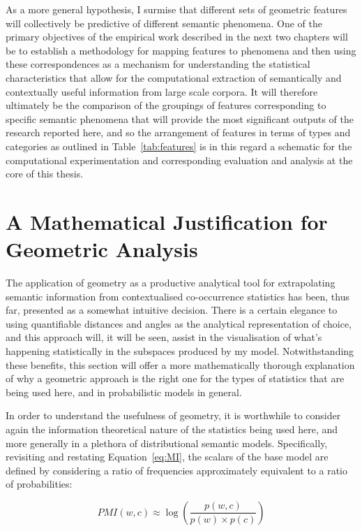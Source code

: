 As a more general hypothesis, I surmise that different sets of geometric features will collectively be predictive of different semantic phenomena.  One of the primary objectives of the empirical work described in the next two chapters will be to establish a methodology for mapping features to phenomena and then using these correspondences as a mechanism for understanding the statistical characteristics that allow for the computational extraction of semantically and contextually useful information from large scale corpora.  It will therefore ultimately be the comparison of the groupings of features corresponding to specific semantic phenomena that will provide the most significant outputs of the research reported here, and so the arrangement of features in terms of types and categories as outlined in Table~\ref{tab:features} is in this regard a schematic for the computational experimentation and corresponding evaluation and analysis at the core of this thesis.

\section{A Mathematical Justification for Geometric Analysis}
The application of geometry as a productive analytical tool for extrapolating semantic information from contextualised co-occurrence statistics has been, thus far, presented as a somewhat intuitive decision.  There is a certain elegance to using quantifiable distances and angles as the analytical representation of choice, and this approach will, it will be seen, assist in the visualisation of what's happening statistically in the subspaces produced by my model.  Notwithstanding these benefits, this section will offer a more mathematically thorough explanation of why a geometric approach is the right one for the types of statistics that are being used here, and in probabilistic models in general.

In order to understand the usefulness of geometry, it is worthwhile to consider again the information theoretical nature of the statistics being used here, and more generally in a plethora of distributional semantic models.  Specifically, revisiting and restating Equation~\ref{eq:MI}, the scalars of the base model are defined by considering a ratio of frequencies approximately equivalent to a ratio of probabilities:

\begin{equation}
PMI(w,c) \approx \log\left(\frac{p(w,c)}{p(w) \times p(c)}\right)
\end{equation}

